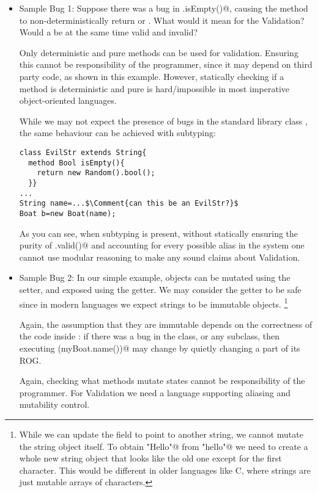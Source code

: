 \begin{itemize}
\item Sample Bug 1:
Suppose there was a bug in \Q@String.isEmpty()@, causing the method to non-deterministically return \Q@true@ or \Q@false@.
What would it mean for the \Q@Boat@ Validation?
Would a \Q@Boat@ be at the same time 
valid and invalid?

Only deterministic and pure methods can be used for validation.
Ensuring this cannot be responsibility of the \Q@Boat@ programmer, since it may depend on third party code, as shown in this example.
However, statically checking if a method is deterministic and pure is hard/impossible in most imperative object-oriented languages.

While we may not expect the presence of bugs in the standard library class \Q@String@, the same behaviour can be achieved with subtyping:
\saveSpace
\begin{lstlisting}
class EvilStr extends String{
  method Bool isEmpty(){
    return new Random().bool();
  }}
...
String name=...$\Comment{can this be an EvilStr?}$
Boat b=new Boat(name);
\end{lstlisting}
\saveSpace
As you can see, when subtyping is present,
without statically ensuring the purity of \Q@.valid()@ and accounting
for every possible alias in the system one cannot use modular 
reasoning to make any sound claims about Validation.


\item Sample Bug 2:
In our simple example, \Q@Boat@ objects can be mutated using the setter, and exposed using the getter.
We may consider the getter to be safe since in modern languages we expect strings to be immutable objects.
\footnote{While we can update the field \Q@name@ to point to another string, we cannot mutate the string object itself.
To obtain  \Q@"Hello"@ from \Q@"hello"@ we need to create a whole new string object that looks like the old one except for the first character. This would be different in older languages like C, where strings are just mutable arrays of characters.}

Again, the assumption that they are immutable depends on the correctness of the code inside \Q@String@: if there was a bug in the \Q@String@ class, or any \Q@String@ subclass, then executing 
\Q@println(myBoat.name())@ may change \Q@myBoat@ by quietly changing a part of its ROG.

Again, checking
what methods mutate states cannot be responsibility of the \Q@Boat@ programmer.
For Validation we need a language supporting aliasing and mutability control.



\end{itemize}
